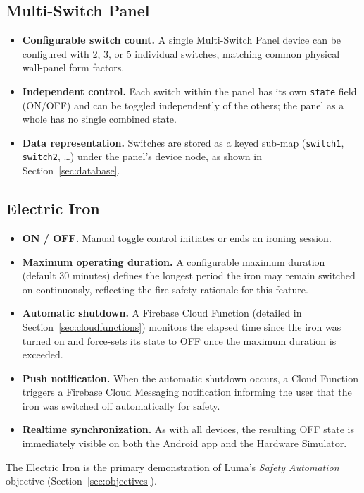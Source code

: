 \documentclass[11pt,a4paper]{article}
\begin{document}
\subsection{Multi-Switch Panel}
\begin{itemize}
    \item \textbf{Configurable switch count.} A single Multi-Switch Panel device can be configured with 2, 3, or 5 individual switches, matching common physical wall-panel form factors.
    \item \textbf{Independent control.} Each switch within the panel has its own \texttt{state} field (ON/OFF) and can be toggled independently of the others; the panel as a whole has no single combined state.
    \item \textbf{Data representation.} Switches are stored as a keyed sub-map (\texttt{switch1}, \texttt{switch2}, \ldots) under the panel's device node, as shown in Section~\ref{sec:database}.
\end{itemize}

\subsection{Electric Iron}
\begin{itemize}
    \item \textbf{ON / OFF.} Manual toggle control initiates or ends an ironing session.
    \item \textbf{Maximum operating duration.} A configurable maximum duration (default 30 minutes) defines the longest period the iron may remain switched on continuously, reflecting the fire-safety rationale for this feature.
    \item \textbf{Automatic shutdown.} A Firebase Cloud Function (detailed in Section~\ref{sec:cloudfunctions}) monitors the elapsed time since the iron was turned on and force-sets its state to OFF once the maximum duration is exceeded.
    \item \textbf{Push notification.} When the automatic shutdown occurs, a Cloud Function triggers a Firebase Cloud Messaging notification informing the user that the iron was switched off automatically for safety.
    \item \textbf{Realtime synchronization.} As with all devices, the resulting OFF state is immediately visible on both the Android app and the Hardware Simulator.
\end{itemize}
The Electric Iron is the primary demonstration of Luma's \emph{Safety Automation} objective (Section~\ref{sec:objectives}).
\end{document}
